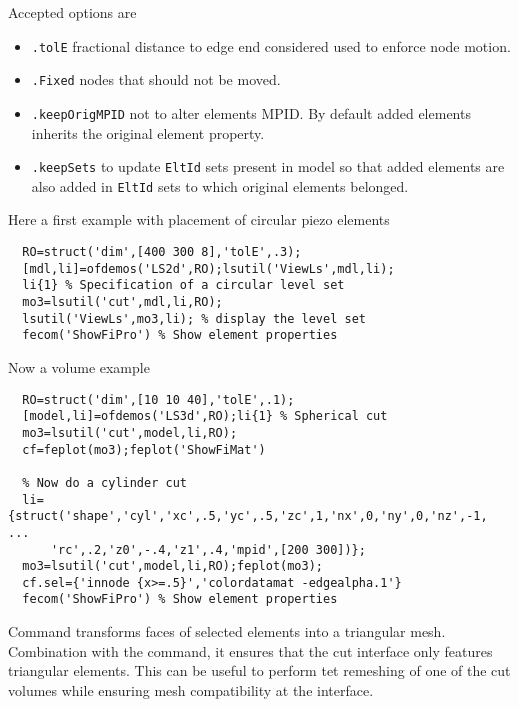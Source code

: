 
Accepted options are

\begin{itemize}
\item {\tt .tolE}  fractional distance to edge end considered used to
enforce node motion. 
\item {\tt .Fixed} nodes that should not be moved.
\item {\tt .keepOrigMPID} not to alter elements MPID.  By default added elements inherits the original element property.
\item {\tt .keepSets} to update {\tt EltId} sets present in model so that added elements are also added in {\tt EltId} sets to which original elements belonged.

\end{itemize}

Here a first example with placement of circular piezo elements 
\begin{verbatim}
  RO=struct('dim',[400 300 8],'tolE',.3);
  [mdl,li]=ofdemos('LS2d',RO);lsutil('ViewLs',mdl,li);
  li{1} % Specification of a circular level set
  mo3=lsutil('cut',mdl,li,RO);
  lsutil('ViewLs',mo3,li); % display the level set
  fecom('ShowFiPro') % Show element properties
\end{verbatim}%

Now a volume example

\begin{verbatim}
  RO=struct('dim',[10 10 40],'tolE',.1);
  [model,li]=ofdemos('LS3d',RO);li{1} % Spherical cut
  mo3=lsutil('cut',model,li,RO);
  cf=feplot(mo3);feplot('ShowFiMat')
  
  % Now do a cylinder cut
  li={struct('shape','cyl','xc',.5,'yc',.5,'zc',1,'nx',0,'ny',0,'nz',-1, ...
      'rc',.2,'z0',-.4,'z1',.4,'mpid',[200 300])};
  mo3=lsutil('cut',model,li,RO);feplot(mo3);
  cf.sel={'innode {x>=.5}','colordatamat -edgealpha.1'}
  fecom('ShowFiPro') % Show element properties
\end{verbatim}%


\vs

Command  transforms faces of selected elements into a triangular mesh. Combination with the  command, it ensures that the cut interface only features triangular elements. This can be useful to perform tet remeshing of one of the cut volumes while ensuring mesh compatibility at the interface.

